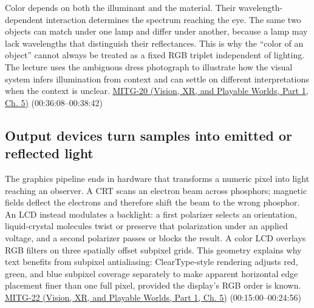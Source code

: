 Color depends on both the illuminant and the material. Their wavelength-dependent interaction determines the spectrum reaching the eye. The same two objects can match under one lamp and differ under another, because a lamp may lack wavelengths that distinguish their reflectances. This is why the ``color of an object'' cannot always be treated as a fixed RGB triplet independent of lighting. The lecture uses the ambiguous dress photograph to illustrate how the visual system infers illumination from context and can settle on different interpretations when the context is unclear. \href{../07-Vision-XR-and-Playable-Worlds-P01/main.pdf\#nameddest=04-visual-computing-ii-ch036-mitg-20---color}{MITG-20 (Vision, XR, and Playable Worlds, Part 1, Ch. 5)} (00:36:08--00:38:42)

\subsection{Output devices turn samples into emitted or reflected light}\label{03-visual-computing-i-ch004-output-devices-turn-samples-into-emitted-or-reflected-light}

\hypertarget{03-visual-computing-i-ch004-output-devices-turn-samples-into-emitted-or-reflected-light}{}

The graphics pipeline ends in hardware that transforms a numeric pixel into light reaching an observer. A CRT scans an electron beam across phosphors; magnetic fields deflect the electrons and therefore shift the beam to the wrong phosphor. An LCD instead modulates a backlight: a first polarizer selects an orientation, liquid-crystal molecules twist or preserve that polarization under an applied voltage, and a second polarizer passes or blocks the result. A color LCD overlays RGB filters on three spatially offset subpixel grids. This geometry explains why text benefits from subpixel antialiasing: ClearType-style rendering adjusts red, green, and blue subpixel coverage separately to make apparent horizontal edge placement finer than one full pixel, provided the display's RGB order is known. \href{../07-Vision-XR-and-Playable-Worlds-P01/main.pdf\#nameddest=04-visual-computing-ii-ch036-mitg-22---output-devices}{MITG-22 (Vision, XR, and Playable Worlds, Part 1, Ch. 5)} (00:15:00--00:24:56)

